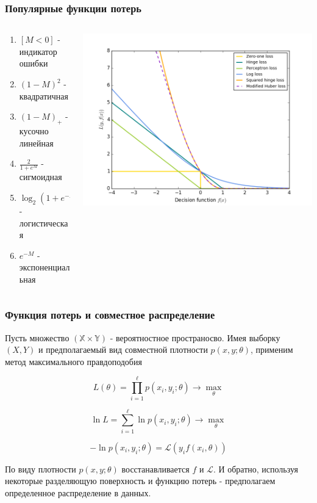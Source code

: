 \documentclass{beamer}
\begin{document}
	\begin{frame}
		\frametitle{Популярные функции потерь}
		
		\begin{columns}
			\begin{column}{0.4\textwidth}
				\begin{enumerate}
					\item $[M < 0]$ - индикатор ошибки
					\item $(1 - M)^2$ - квадратичная
					\item $(1 - M)_{+}$ - кусочно линейная
					\item $\frac{2}{1 + e^M}$ - сигмоидная
					\item $\log_2(1 + e^{-M})$ - логистическая
					\item $e^{-M}$ - экспоненциальная
				\end{enumerate}
			\end{column}
			\begin{column}{0.6\textwidth}
				\centering
				\includegraphics[width=1.15\textwidth]{img/loss_func.png}	
			\end{column}
		\end{columns}
	\end{frame}
	
	\begin{frame}
		\frametitle{Функция потерь и совместное распределение}
		Пусть множество $(\mathbb{X} \times \mathbb{Y})$ - вероятностное пространосво. Имея выборку $(X, Y)$ и предполагаемый вид совместной плотности $p(x, y; \theta)$, применим метод максимального правдоподобия
		
		\[
		L(\theta) = \prod_{i=1}^{\ell} p(x_i, y_i; \theta) \rightarrow \max_{\theta}
		\]
		
		\[
		\ln L = \sum_{i=1}^{\ell} \ln p(x_i, y_i; \theta) \rightarrow \max_{\theta}
		\]
		
		\[
		- \ln p(x_i, y_i; \theta) = \mathcal{L}(y_i f(x_i, \theta))
		\]
		
		По виду плотности $p(x, y; \theta)$ восстанавливается $f$ и $\mathcal{L}$. И обратно, используя некоторые разделяющую поверхность и функцию потерь - предполагаем определенное распределение в данных.
	\end{frame}
	
\end{document}
